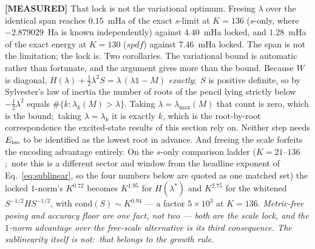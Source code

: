 \documentclass[aps,pra,twocolumn,superscriptaddress,longbibliography]{revtex4-2}
\newcommand{\gvq}[2]{#2}
\begin{document}
\textbf{[MEASURED]} That lock is not the variational optimum.  Freeing $\lambda$
over the identical span reaches $0.15$~mHa of the exact $s$-limit at $K=136$
($s$-only, where $-2.879029$~Ha is known independently) against $\gvq{p60_span_deficit_sonly_locked}{4.40}$~mHa
locked, and $\gvq{p60_span_deficit_spdf}{1.28}$~mHa of the exact energy at
$K=130$ ($spdf$) against $7.46$~mHa locked.  The span is not the limitation; the
lock is.  Two corollaries.  The variational bound is automatic rather than
fortunate, and the argument gives more than the bound.  Because $W$ is
diagonal, $H(\lambda)+\tfrac12\lambda^{2}S=\lambda\,(\lambda\mathbb{1}-M)$
\emph{exactly};\ $S$ is positive definite, so by Sylvester's law of inertia
the number of roots of the pencil lying strictly below $-\tfrac12\lambda^{2}$
equals $\#\{k:\lambda_k(M)>\lambda\}$.  Taking
$\lambda=\lambda_{\max}(M)$ that count is zero, which is the bound;\ taking
$\lambda=\lambda_k$ it is exactly $k$, which is the root-by-root
correspondence the excited-state results of this section rely on.  Neither
step needs $E_{\rm iso}$ to be identified as the lowest root in advance.  And freeing the scale forfeits the
encoding advantage entirely.  On the $s$-only comparison ladder
($K=21$--$136$;\ note this is a different sector and window from the headline
exponent of Eq.~\eqref{eq:sublinear}, so the four numbers below are quoted as one
matched set) the locked $1$-norm's
$K^{\gvq{p60_freescale_set_sonly}{0.72}}$ becomes $K^{1.95}$ for
$H(\lambda^{\ast})$ and $K^{2.75}$ for the whitened $S^{-1/2}HS^{-1/2}$, with
$\mathrm{cond}(S)\sim K^{0.94}$ --- a factor $5\times10^{3}$ at $K=136$.  \emph{Metric-free posing and accuracy floor are
one fact, not two --- both are the scale lock, and the $1$-norm advantage
\emph{over the free-scale alternative} is its third consequence.  The
sublinearity itself is not:\ that belongs to the growth rule.}
\end{document}
